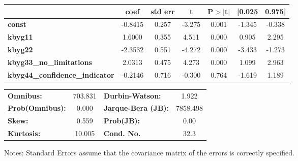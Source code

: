\begin{center}
\begin{tabular}{lclc}
\end{tabular}
\begin{tabular}{lcccccc}
                                       & \textbf{coef} & \textbf{std err} & \textbf{t} & \textbf{P$> |$t$|$} & \textbf{[0.025} & \textbf{0.975]}  \\
\midrule
\textbf{const}                         &      -0.8415  &        0.257     &    -3.275  &         0.001        &       -1.345    &       -0.338     \\
\textbf{kbyg11}                        &       1.6000  &        0.355     &     4.511  &         0.000        &        0.905    &        2.295     \\
\textbf{kbyg22}                        &      -2.3532  &        0.551     &    -4.272  &         0.000        &       -3.433    &       -1.273     \\
\textbf{kbyg33\_no\_limitations}       &       2.0313  &        0.475     &     4.273  &         0.000        &        1.099    &        2.963     \\
\textbf{kbyg44\_confidence\_indicator} &      -0.2146  &        0.716     &    -0.300  &         0.764        &       -1.619    &        1.189     \\
\bottomrule
\end{tabular}
\begin{tabular}{lclc}
\textbf{Omnibus:}       & 703.831 & \textbf{  Durbin-Watson:     } &    1.922  \\
\textbf{Prob(Omnibus):} &   0.000 & \textbf{  Jarque-Bera (JB):  } & 7858.498  \\
\textbf{Skew:}          &   0.559 & \textbf{  Prob(JB):          } &     0.00  \\
\textbf{Kurtosis:}      &  10.005 & \textbf{  Cond. No.          } &     32.3  \\
\bottomrule
\end{tabular}
\end{center}

Notes: \newline
 [1] Standard Errors assume that the covariance matrix of the errors is correctly specified.